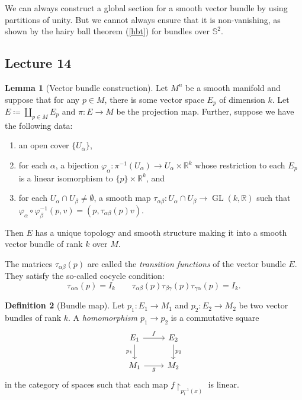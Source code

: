 \documentclass[10pt,letterpaper,cm]{nupset}
\theoremstyle{definition}
\newtheorem{definition}{Definition}[subsection]
\theoremstyle{theorem}
\newtheorem{lemma}[definition]{Lemma}
\theoremstyle{remark}
\newcommand{\R}{\mathbb R}
\renewcommand{\S}{\mathbb S}
\newcommand{\1}{\mathbf{1}}
\newcommand{\0}{\vec 0}
\DeclareMathOperator{\GL}{GL}
\begin{document}
We can always construct a global section for a smooth vector bundle by using partitions of unity. But we cannot always ensure that it is non-vanishing, as shown by the hairy ball theorem (\cref{hbt}) for bundles over $\S^2$.


\subsection{Lecture 14}

\begin{lemma}[Vector bundle construction]
Let $M^n$ be a smooth manifold and suppose that for any $p\in M$, there is some vector space $E_p$ of dimension $k$. Let $E\coloneqq  \coprod_{p\in M} E_p$ and $\pi : E \to M$ be the projection map. Further, suppose we have the following data:
\begin{enumerate}[label=(\alph*)]
\item an open cover $\{U_{\alpha}\}$,
\item for each $\alpha$, a bijection $\varphi_{\alpha} : \pi^{-1}(U_{\alpha}) \to U_{\alpha} \times \R^k$ whose restriction to each $E_p$ is a linear isomorphism to $\{p\}\times \R^k$, and
\item for each $U_{\alpha} \cap U_{\beta} \ne \emptyset$, a smooth map $\tau_{\alpha \beta} : U_{\alpha} \cap U_{\beta} \to \GL(k , \R)$ such that $\varphi_{\alpha} \circ \varphi_{\beta}^{-1}(p, v) = \left(p, \tau_{\alpha \beta}(p)v\right)$.
\end{enumerate}
Then $E$ has a unique topology and smooth structure making it into a smooth vector bundle of rank $k$ over $M$.
\end{lemma}

The matrices $\tau_{\alpha \beta}(p)$ are called the \textit{transition functions} of the vector bundle $E$. They satisfy the so-called cocycle condition: 
\[ \tau_{\alpha \alpha}(p) = I_k \quad \quad \tau_{\alpha \beta}(p)\tau_{\beta \gamma}(p)\tau_{\gamma \alpha}(p) = I_k.\]

\begin{definition}[Bundle map]
Let $p_1 : E_1 \to M_1$ and $p_2 : E_2 \to M_2$ be two vector bundles of rank $k$. A \textit{homomorphism $p_1 \to p_2$} is a commutative square
\[
\begin{tikzcd}
E_1 \arrow[d, "p_1"'] \arrow[r, "f"] & E_2 \arrow[d, "p_2"] \\
M_1 \arrow[r, "g"']                  & M_2                 
\end{tikzcd}
\] in the category of spaces such that each map $f\restriction_{p_1^{-1}(x)}$ is  linear. 
\end{definition}
\end{document}
